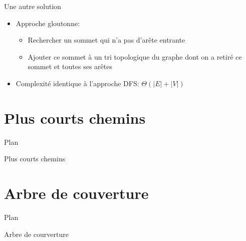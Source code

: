\begin{frame}{Une autre solution}

\begin{itemize}
\item Approche gloutonne:
\begin{itemize}
\item Rechercher un sommet qui n'a pas d'arête entrante 
\item Ajouter ce sommet à un tri topologique du graphe dont on a retiré ce sommet et toutes ses arêtes
\end{itemize}
\item Complexité identique à l'approche DFS: $\Theta(|E|+|V|)$
\end{itemize}

\end{frame}


\section{Plus courts chemins}

\begin{frame}{Plan}

\tableofcontents[currentsection]

\end{frame}

\begin{frame}{Plus courts chemins}

\end{frame}

\section{Arbre de couverture}

\begin{frame}{Plan}

\tableofcontents[currentsection]

\end{frame}

\begin{frame}{Arbre de courverture}
\end{frame}


